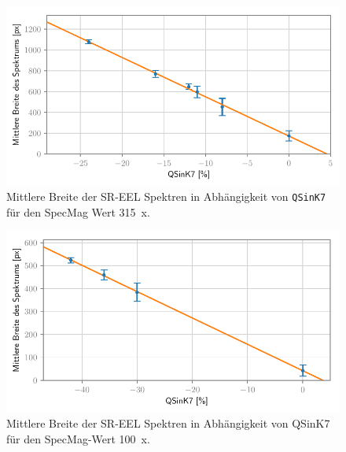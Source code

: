 \documentclass[
	paper=a4,				%
	twoside=true,			%
	BCOR=6mm,				%
	fontsize=12pt,			%
	pagesize=auto,			%
	numbers=noenddot,		%
	bibliography=totoc,		%
	draft=false
]{scrartcl}
\begin{document}
\begin{figure}
	\centering
	\includegraphics[width=1\linewidth]{../../Jupyter-Notebooks/Kapitel2/Bilder/QSinK7_SM315_width-vs-QSinK7}
	\caption{Mittlere Breite der SR-EEL Spektren in Abhängigkeit von \texttt{QSinK7} für den SpecMag Wert \SI{315}{x}.}
	\label{fig:SR-EELS_Charakterisierung_QSinK7_SM315_QSinK7}
\end{figure}

\begin{figure}
	\centering
	\includegraphics[width=1\textwidth]{../../Jupyter-Notebooks/Kapitel2/Bilder/QSinK7_SM100_width-vs-QSinK7}
	\caption{Mittlere Breite der SR-EEL Spektren in Abhängigkeit von QSinK7 für den SpecMag-Wert \SI{100}{x}.}
	\label{fig:SR-EELS_Charakterisierung_QSinK7_SM100_QSinK7}
\end{figure}
\end{document}

